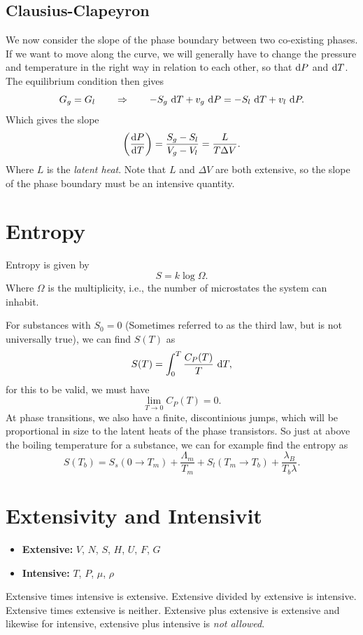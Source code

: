 \documentclass[a4paper, 11pt, notitlepage, english]{article}
\renewcommand{\d}{{\rm d}}
\newcommand{\To}{\quad\Rightarrow\quad}
\begin{document}
\subsection*{Clausius-Clapeyron}
We now consider the slope of the phase boundary between two co-existing phases. If we want to move along the curve, we will generally have to change the pressure and temperature in the right way in relation to each other, so that $\d P$ and $\d T$. The equilibrium condition then gives
$$G_g = G_l \quad \To \quad -S_g \ \d T + v_g \ \d P = - S_l \ \d T + v_l \ \d P.$$
Which gives the slope
$$\bigg(\frac{\d P}{\d T}\bigg) = \frac{S_g - S_l}{V_g - V_l} = \frac{L}{T\Delta V}.$$
Where $L$ is the \emph{latent heat}. Note that $L$ and $\Delta V$ are both extensive, so the slope of the phase boundary must be an intensive quantity.

\section*{Entropy}
Entropy is given by
$$S = k \log \Omega.$$
Where $\Omega$ is the multiplicity, i.e., the number of microstates the system can inhabit.

For substances with $S_0 = 0$ (Sometimes referred to as the third law, but is not universally true), we can find $S(T)$ as
$$S(T) = \int_0^T \frac{C_{P}(T)}{T} \ \d T,$$
for this to be valid, we must have 
$$\lim_{T \to 0} C_P(T) = 0.$$
At phase transitions, we also have a finite, discontinious jumps, which will be proportional in size to the latent heats of the phase transistors. So just at above the boiling temperature for a substance, we can for example find the entropy as
$$S(T_b) = S_s(0\to T_m) + \frac{\Lambda_m}{T_m} + S_l(T_m \to T_b) + \frac{\lambda_B}{T_b\lambda}.$$

\clearpage

\section*{Extensivity and Intensivit}
\begin{itemize}
	\item \textbf{Extensive:} $V$, $N$, $S$, $H$, $U$, $F$, $G$ 
	\item \textbf{Intensive:} $T$, $P$, $\mu$, $\rho$
\end{itemize}
Extensive times intensive is extensive. Extensive divided by extensive is intensive. Extensive times extensive is neither. Extensive plus extensive is extensive and likewise for intensive, extensive plus intensive is \emph{not allowed}.
\end{document}
